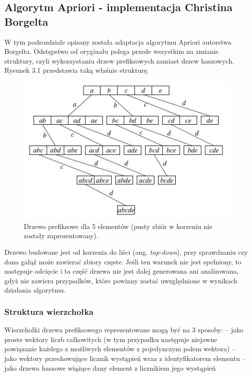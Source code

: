 \subsection{Algorytm Apriori - implementacja Christina Borgelta \cite{Borgelt}}
\label{c322}
W tym podrozdziale opisany została adaptacja algorytmu Apriori autorstwa Borgelta. Odstępstwo od oryginału polega przede wszystkim na zmianie struktury, czyli wykorzystaniu drzew prefiksowych zamiast drzew haszowych. Rysunek 3.1 przedstawia taką właśnie strukturę. 
\begin{figure}[h]
\centering
\includegraphics[width=0.8\linewidth]{figures/prefixTreeBorgelt}
\caption[Rysunek 3.1]{Drzewo prefiksowe dla 5 elementów (pusty zbiór w korzeniu nie zostały zaprezentowany).}
\label{fig:prefixTreeBorgelt}
\end{figure}
Drzewo budowane jest od korzenia do liści (ang. \textit{top-down}), przy sprawdzaniu czy dana gałąź może zawierać zbiory częste. Jeśli ten warunek nie jest spełniony, to następuje odcięcie i ta część drzewa nie jest dalej generowana ani analizowana, gdyż nie zawiera przypadków, które powinny zostać uwzględnione w wynikach działania algorytmu. 

\subsubsection*{Struktura wierzchołka}
Wierzchołki drzewa prefiksowego reprezentowane mogą być na 3 sposoby:\newline
-- jako proste wektory liczb całkowitych (w tym przypadku następuje niejawne powiązanie każdego z możliwych elementów z pojedynczym polem wektora)\newline
-- jako wektory przechowujące licznik wystąpień wraz z identyfikatorem elementu\newline
-- jako drzewa haszowe wiążące dany element z licznikiem jego wystąpień

